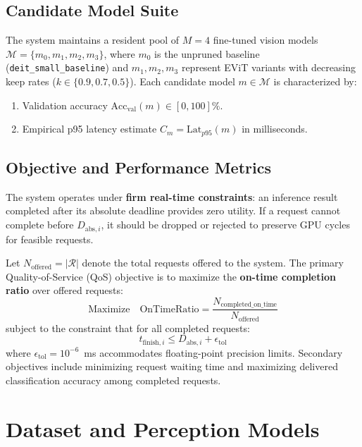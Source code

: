 \documentclass[conference]{IEEEtran}
\begin{document}
\subsection{Candidate Model Suite}
The system maintains a resident pool of $M=4$ fine-tuned vision models $\mathcal{M} = \{m_0, m_1, m_2, m_3\}$, where $m_0$ is the unpruned baseline (\texttt{deit\_small\_baseline}) and $m_1, m_2, m_3$ represent EViT variants with decreasing keep rates ($k \in \{0.9, 0.7, 0.5\}$). Each candidate model $m \in \mathcal{M}$ is characterized by:
\begin{enumerate}
    \item Validation accuracy $\text{Acc}_{\text{val}}(m) \in [0, 100]\%$.
    \item Empirical p95 latency estimate $C_m = \text{Lat}_{p95}(m)$ in milliseconds.
\end{enumerate}

\subsection{Objective and Performance Metrics}
The system operates under \textbf{firm real-time constraints}: an inference result completed after its absolute deadline provides zero utility. If a request cannot complete before $D_{\text{abs}, i}$, it should be dropped or rejected to preserve GPU cycles for feasible requests.

Let $N_{\text{offered}} = |\mathcal{R}|$ denote the total requests offered to the system. The primary Quality-of-Service (QoS) objective is to maximize the \textbf{on-time completion ratio} over offered requests:
\begin{equation}
\text{Maximize} \quad \text{OnTimeRatio} = \frac{N_{\text{completed\_on\_time}}}{N_{\text{offered}}}
\end{equation}
subject to the constraint that for all completed requests:
\begin{equation}
t_{\text{finish}, i} \le D_{\text{abs}, i} + \epsilon_{\text{tol}}
\end{equation}
where $\epsilon_{\text{tol}} = 10^{-6}$~ms accommodates floating-point precision limits. Secondary objectives include minimizing request waiting time and maximizing delivered classification accuracy among completed requests.

\section{Dataset and Perception Models}
\end{document}
